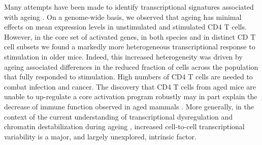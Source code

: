 Many attempts have been made to identify transcriptional signatures associated with ageing \citep{Magalhaes2009, Chen2013, Kowalczyk2015}. On a genome-wide basis, we observed that ageing has minimal effects on mean expression levels in unstimulated and stimulated CD4\plus{} T cells. However, in the core set of activated genes, in both species and in distinct CD\plus{} T cell subsets we found a markedly more heterogeneous transcriptional response to stimulation in older mice. Indeed, this increased heterogeneity was driven by ageing associated differences in the reduced fraction of cells across the population that fully responded to stimulation. High numbers of CD4\plus{} T cells are needed to combat infection and cancer. The discovery that CD4\plus{} T cells from aged mice are unable to up-regulate a core activation program robustly may in part explain the decrease of immune function observed in aged mammals \citep{Goronzy2013}. More generally, in the context of the current understanding of transcriptional dysregulation and chromatin destabilization during ageing \citep{Booth2016}, increased cell-to-cell transcriptional variability is a major, and largely unexplored, intrinsic factor.\\






